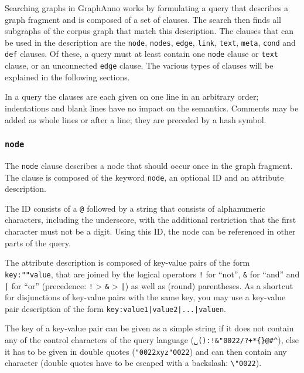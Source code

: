 \documentclass[12pt]{scrartcl}
\newcommand{\quo}{\char"0022}
\begin{document}
Searching graphs in GraphAnno works by formulating a query that describes a graph fragment and is composed of a set of clauses.
The search then finds all subgraphs of the corpus graph that match this description.
The clauses that can be used in the description are the \texttt{node}, \texttt{nodes}, \texttt{edge}, \texttt{link}, \texttt{text}, \texttt{meta}, \texttt{cond} and \texttt{def} clauses.
Of these, a query must at least contain one \texttt{node} clause or \texttt{text} clause, or an unconnected \texttt{edge} clause.
The various types of clauses will be explained in the following sections.

In a query the clauses are each given on one line in an arbitrary order; indentations and blank lines have no impact on the semantics.
Comments may be added as whole lines or after a line; they are preceded by a hash symbol.


\subsubsection{\texttt{node}}\label{node}

The \texttt{node} clause describes a node that should occur once in the graph fragment.
The clause is composed of the keyword \texttt{node}, an optional ID and an attribute description.

The ID consists of a \texttt{@} followed by a string that consists of alphanumeric characters, including the underscore, with the additional restriction that the first character must not be a digit.
Using this ID, the node can be referenced in other parts of the query.

The attribute description is composed of key-value pairs of the form \texttt{key:""value}, that are joined by the logical operators \texttt{!} for “not”, \texttt{\&} for “and” and \texttt{|} for “or” (precedence: \texttt{!} > \texttt{\&} > \texttt{|}) as well as (round) parentheses.
As a shortcut for disjunctions of key-value pairs with the same key, you may use a key-value pair description of the form \texttt{key:value1|value2|...|valuen}.

The key of a key-value pair can be given as a simple string if it does not contain any of the control characters of the query language (\texttt{␣():!\&\quo/?+*\{\}@\#\^{}}), else it has to be given in double quotes (\texttt{{\quo}xyz\quo}) and can then contain any character (double quotes have to be escaped with a backslash: \texttt{\textbackslash\quo}).
\end{document}
